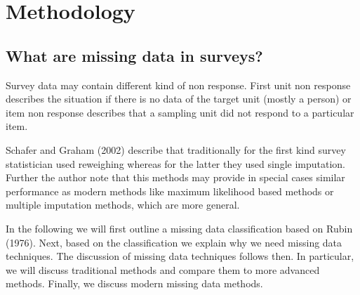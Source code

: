 \section{Methodology}

\subsection{What are missing data in surveys?}
Survey data may contain different kind of non response. First unit non response describes the situation if there is no data of the target unit (mostly a person) or item non response describes that a sampling unit did not respond to a particular item. \par
Schafer and Graham (2002) describe that traditionally for the first kind survey statistician used reweighing whereas for the latter they used single imputation.
 Further the author note that this methods may provide in special cases similar performance as modern methods like maximum likelihood based methods or multiple imputation methods, which are more general.  \par
In the following we will first outline a missing data classification based on Rubin (1976). 
Next, based on the classification we explain why we need missing data techniques. 
The discussion of missing data techniques follows then. In particular, we will discuss traditional methods and compare them to more advanced methods. 
Finally, we discuss modern missing data methods. \par

